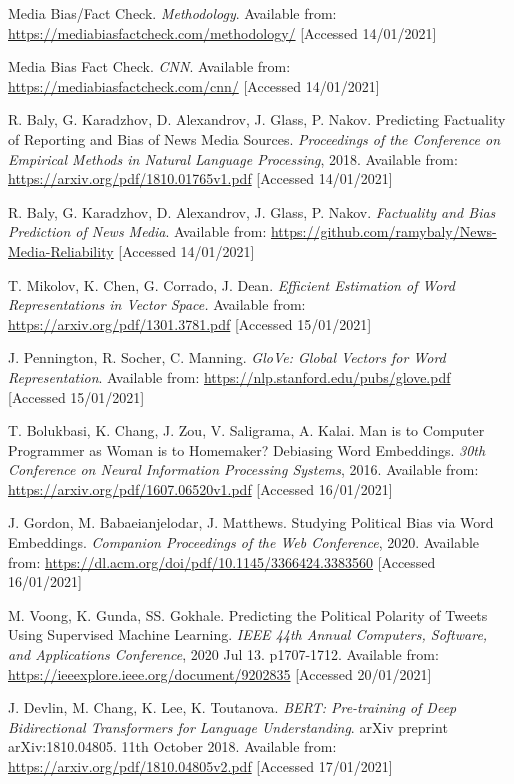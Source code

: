 \begin{thebibliography}{9}
Media Bias/Fact Check. \textit{Methodology}. Available from: \url{https://mediabiasfactcheck.com/methodology/} [Accessed 14/01/2021]

Media Bias Fact Check. \textit{CNN}. Available from: \url{https://mediabiasfactcheck.com/cnn/} [Accessed 14/01/2021]

R. Baly, G. Karadzhov, D. Alexandrov, J. Glass, P. Nakov. Predicting Factuality of Reporting and Bias of News Media Sources. \textit{Proceedings of the Conference on Empirical Methods in Natural Language Processing}, 2018. Available from: \url{https://arxiv.org/pdf/1810.01765v1.pdf} [Accessed 14/01/2021]

R. Baly, G. Karadzhov, D. Alexandrov, J. Glass, P. Nakov. \textit{Factuality and Bias Prediction of News Media}. Available from: \url{https://github.com/ramybaly/News-Media-Reliability} [Accessed 14/01/2021]

T. Mikolov, K. Chen, G. Corrado, J. Dean. \textit{Efficient Estimation of Word Representations in Vector Space.} Available from: \url{https://arxiv.org/pdf/1301.3781.pdf} [Accessed 15/01/2021]

J. Pennington, R. Socher, C. Manning. \textit{GloVe: Global Vectors for Word Representation}. Available from: \url{https://nlp.stanford.edu/pubs/glove.pdf} [Accessed 15/01/2021]

T. Bolukbasi, K. Chang, J. Zou, V. Saligrama, A. Kalai. Man is to Computer Programmer as Woman is to
Homemaker? Debiasing Word Embeddings. \textit{30th Conference on Neural Information Processing Systems}, 2016. Available from: \url{https://arxiv.org/pdf/1607.06520v1.pdf} [Accessed 16/01/2021]

J. Gordon, M. Babaeianjelodar, J. Matthews. Studying Political Bias via Word Embeddings. \textit{Companion Proceedings of the Web Conference}, 2020. Available from: \url{https://dl.acm.org/doi/pdf/10.1145/3366424.3383560} [Accessed 16/01/2021]

M. Voong, K. Gunda, SS. Gokhale. Predicting the Political Polarity of Tweets Using Supervised Machine Learning. \textit{IEEE 44th Annual Computers, Software, and Applications Conference}, 2020 Jul 13. p1707-1712. Available from: \url{https://ieeexplore.ieee.org/document/9202835} [Accessed 20/01/2021]

J. Devlin, M. Chang, K. Lee, K. Toutanova. \textit{BERT: Pre-training of Deep Bidirectional Transformers for Language Understanding}. arXiv preprint arXiv:1810.04805. 11th October 2018. Available from: \url{https://arxiv.org/pdf/1810.04805v2.pdf} [Accessed 17/01/2021]


\end{thebibliography}
